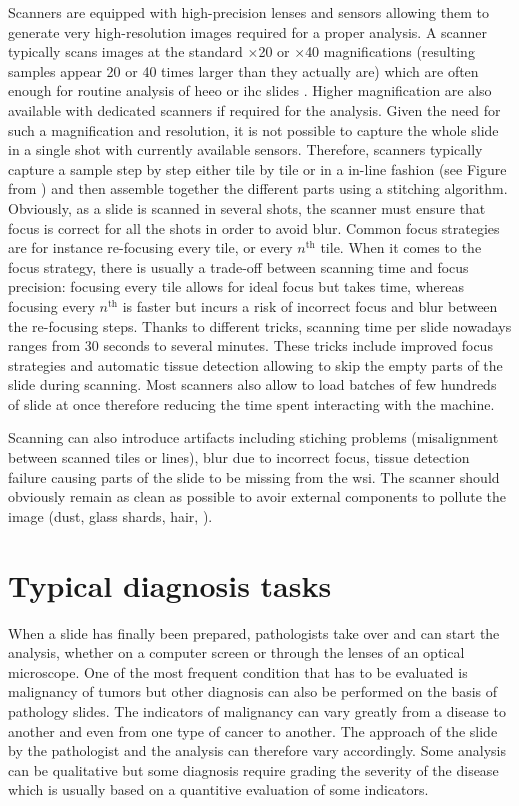 Scanners are equipped with high-precision lenses and sensors allowing them to generate very high-resolution images required for a proper analysis. A scanner typically scans images at the standard $\times$20 or $\times$40 magnifications (\ie resulting samples appear 20 or 40 times larger than they actually are) which are often enough for routine analysis of \acrshort{heeo} or \acrshort{ihc} slides \parencite{zarella2019practical}. Higher magnification are also available with dedicated scanners if required for the analysis. Given the need for such a magnification and resolution, it is not possible to capture the whole slide in a single shot with currently available sensors. Therefore, scanners typically capture a sample step by step either tile by tile or in a in-line fashion (see Figure  from \parencite{jahn2020digital}) and then assemble together the different parts using a stitching algorithm. Obviously, as a slide is scanned in several shots, the scanner must ensure that focus is correct for all the shots in order to avoid blur. Common focus strategies are for instance re-focusing every tile, or every $n^{\text{th}}$ tile. When it comes to the focus strategy, there is usually a trade-off between scanning time and focus precision: focusing every tile allows for ideal focus but takes time, whereas focusing every $n^{\text{th}}$ is faster but incurs a risk of incorrect focus and blur between the re-focusing steps. Thanks to different tricks, scanning time per slide nowadays ranges from 30 seconds to several minutes. These tricks include improved focus strategies and automatic tissue detection allowing to skip the empty parts of the slide during scanning. Most scanners also allow to load batches of few hundreds of slide at once therefore reducing the time spent interacting with the machine.

Scanning can also introduce artifacts including stiching problems (\ie misalignment between scanned tiles or lines), blur due to incorrect focus, tissue detection failure causing parts of the slide to be missing from the \acrshort{wsi}. The scanner should obviously remain as clean as possible to avoir external components to pollute the image (\eg dust, glass shards, hair, \etc). 

\section{Typical diagnosis tasks}
\label{sec:backdp:typicaldiagnosistasks}

When a slide has finally been prepared, pathologists take over and can start the analysis, whether on a computer screen or through the lenses of an optical microscope. One of the most frequent condition that has to be evaluated is malignancy of tumors but other diagnosis can also be performed on the basis of pathology slides. The indicators of malignancy can vary greatly from a disease to another and even from one type of cancer to another. The approach of the slide by the pathologist and the analysis can therefore vary accordingly. Some analysis can be qualitative but some diagnosis require grading the severity of the disease which is usually based on a quantitive evaluation of some indicators. 

